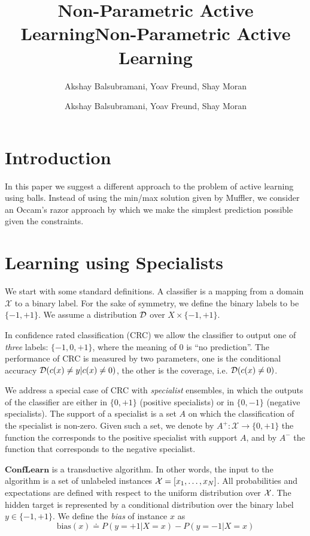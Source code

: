 \documentclass{article}
\title{Non-Parametric Active Learning}
\author{Akshay Balsubramani, Yoav Freund, Shay Moran}
\title{Non-Parametric Active Learning}
\author{Akshay Balsubramani, Yoav Freund, Shay Moran}
\newcommand{\D}{{\cal D}}
\newcommand{\cX}{\mathcal{X}}
\newcommand{\bias}{\text{bias}}
\newcommand{\ActiveLearn}{\mathbf{ConfLearn}}
\newcommand{\universe}[1]{{\cal #1}}
\begin{document}
\maketitle
\section{Introduction}

In this paper we suggest a different approach to the problem of active
learning using balls. Instead of using the min/max solution given by
Muffler, we consider an Occam's razor approach by which we make the
simplest prediction possible given the constraints.

\section{Learning using Specialists}

We start with some standard definitions. A classifier is a
mapping from a domain $\cX$ to a binary label. For the sake of symmetry,
we define the binary labels to be $\{-1,+1\}$. We assume a
distribution $\D$ over $X \times \{-1,+1\}$.

In confidence rated classification (CRC) we allow the classifier to
output one of {\em three} labels: $\{-1,0,+1\}$, where the meaning of
$0$ is ``no prediction''. The performance of CRC is measured by two
parameters, one is the conditional accuracy $\D(c(x) \neq y | c(x) \neq
0)$, the other is the coverage, i.e. $\D(c(x) \neq 0)$.

We address a special case of CRC with {\em specialist} ensembles, 
in which the outputs of the classifier are either in $\{0,+1\}$ (positive specialists) or in
$\{0,-1\}$ (negative specialists). 
The support of a specialist is a set $A$ on which the classification of
the specialist is non-zero. Given such a set, we denote by $A^+: \cX \to \{0,+1\}$ the
function the corresponds to the positive specialist with support $A$, and by $A^-$ the
function that corresponds to the negative specialist.


$\ActiveLearn$ is a transductive algorithm. In other words, the input
to the algorithm is a set of unlabeled instances $\universe{X} =
[x_1,\ldots,x_N]$. All probabilities and expectations are defined with
respect to the uniform distribution over $\universe{X}$. The hidden
target is represented by a conditional distribution over the binary label
$y \in \{-1,+1\}$. We define the {\em bias} of instance $x$ as
\[
\bias(x) \doteq P(y=+1|X=x) - P(y=-1|X=x)
\]
\end{document}
